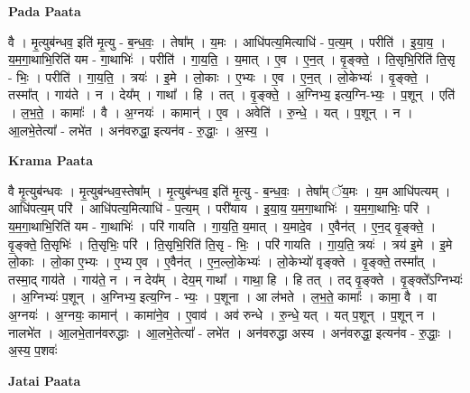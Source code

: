 \documentclass[17pt]{extarticle}
\begin{document}
\textbf{Pada Paata} \newline

वै । मृ॒त्युब॑न्धव॒ इति॑ मृ॒त्यु - ब॒न्ध॒वः॒ । तेषा᳚म् । य॒मः । आधि॑पत्य॒मित्याधि॑ - प॒त्य॒म् । परीति॑ । इ॒या॒य॒ । य॒म॒गा॒थाभि॒रिति॑ यम - गा॒थाभिः॑ । परीति॑ । गा॒य॒ति॒ । य॒मात् । ए॒व । ए॒न॒त् । वृ॒ङ्क्ते॒ । ति॒सृभि॒रिति॑ ति॒सृ - भिः॒ । परीति॑ । गा॒य॒ति॒ । त्रयः॑ । इ॒मे । लो॒काः । ए॒भ्यः । ए॒व । ए॒न॒त् । लो॒केभ्यः॑ । वृ॒ङ्क्ते॒ । तस्मा᳚त् । गाय॑ते । न । देय᳚म् । गाथा᳚ । हि । तत् । वृ॒ङ्क्ते॒ । अ॒ग्निभ्य॒ इत्य॒ग्नि-भ्यः॒ । प॒शून् । एति॑ । ल॒भ॒ते॒ । कामाः᳚ । वै । अ॒ग्नयः॑ । कामान्॑ । ए॒व । अवेति॑ । रु॒न्धे॒ । यत् । प॒शून् । न । आ॒लभे॒तेत्या᳚ - लभे॑त । अन॑वरुद्धा॒ इत्यन॑व - रु॒द्धाः॒ । अ॒स्य॒ ।  \newline


\textbf{Krama Paata} \newline

वै मृ॒त्युब॑न्धवः । मृ॒त्युब॑न्धव॒स्तेषा᳚म् । मृ॒त्युब॑न्धव॒ इति॑ मृ॒त्यु - ब॒न्ध॒वः॒ । तेषा᳚म् ॅय॒मः । य॒म आधि॑पत्यम् । आधि॑पत्य॒म् परि॑ । आधि॑पत्य॒मित्याधि॑ - प॒त्य॒म् । परी॑याय । इ॒या॒य॒ य॒म॒गा॒थाभिः॑ । य॒म॒गा॒थाभिः॒ परि॑ । य॒म॒गा॒थाभि॒रिति॑ यम - गा॒थाभिः॑ । परि॑ गायति । गा॒य॒ति॒ य॒मात् । य॒मादे॒व । ए॒वैन॑त् । ए॒न॒द् वृ॒ङ्क्ते॒ । वृ॒ङ्क्ते॒ ति॒सृभिः॑ । ति॒सृभिः॒ परि॑ । ति॒सृभि॒रिति॑ ति॒सृ - भिः॒ । परि॑ गायति । गा॒य॒ति॒ त्रयः॑ । त्रय॑ इ॒मे । इ॒मे लो॒काः । लो॒का ए॒भ्यः । ए॒भ्य ए॒व । ए॒वैन॑त् । ए॒न॒ल्लो॒केभ्यः॑ । लो॒केभ्यो॑ वृङ्क्ते । वृ॒ङ्क्ते॒ तस्मा᳚त् । तस्मा॒द् गाय॑ते । गाय॑ते॒ न । न देय᳚म् । देय॒म् गाथा᳚ । गाथा॒ हि । हि तत् । तद् वृ॒ङ्क्ते । वृ॒ङ्क्ते᳚ऽग्निभ्यः॑ । अ॒ग्निभ्यः॑ प॒शून् । अ॒ग्निभ्य॒ इत्य॒ग्नि - भ्यः॒ । प॒शूना । आ ल॑भते । ल॒भ॒ते॒ कामाः᳚ । कामा॒ वै । वा अ॒ग्नयः॑ । अ॒ग्नयः॒ कामान्॑ । कामा॑ने॒व । ए॒वाव॑ । अव॑ रुन्धे । रु॒न्धे॒ यत् । यत् प॒शून् । प॒शून् न । नालभे॑त । आ॒लभे॒तान॑वरुद्धाः । आ॒लभे॒तेत्या᳚ - लभे॑त । अन॑वरुद्धा अस्य । अन॑वरुद्धा॒ इत्यन॑व - रु॒द्धाः॒ । अ॒स्य॒ प॒शवः॑ \newline

\textbf{Jatai Paata} \newline
\end{document}
